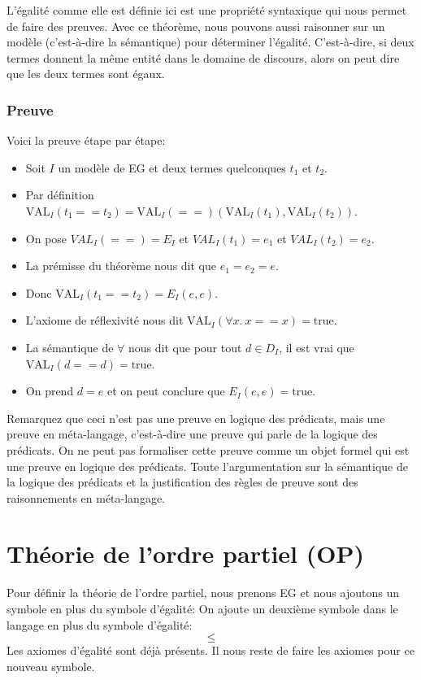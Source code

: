 {L'égalité comme elle est définie ici est une propriété syntaxique qui nous permet de faire des preuves.
Avec ce théorème, nous pouvons aussi raisonner sur un modèle (c'est-à-dire la sémantique) pour déterminer l'égalité.
C'est-à-dire, si deux termes donnent la même entité dans le domaine de discours, alors on peut dire que les
deux termes sont égaux.

\subsubsection{Preuve}

Voici la preuve étape par étape:
\begin{itemize}
\item Soit $I$ un modèle de EG et deux termes quelconques $t_{1}$ et $t_{2}$.
\item Par définition $\mathrm{VAL}_{I}(t_{1} == t_{2}) = \mathrm{VAL}_{I}(==)(\mathrm{VAL}_{I}(t_{1}), \mathrm{VAL}_{I}(t_{2}))$.
\item On pose $VAL_{I}(==) = E_{I}$ et $VAL_{I}(t_{1}) = e_1$ et $VAL_{I}(t_{2}) = e_2$.
\item La prémisse du théorème nous dit que $e_1 = e_2 = e$.
\item Donc $\mathrm{VAL}_{I}(t_{1} == t_{2}) =E_{I}(e,e)$.
\item L'axiome de réflexivité nous dit $\mathrm{VAL}_{I}(\forall x.\ x==x)= \mathrm{true}$.
\item La sémantique de $\forall$ nous dit que pour tout $d \in D_I$, il est vrai que $\mathrm{VAL}_{I}(d==d)=\mathrm{true}$.
\item On prend $d=e$ et on peut conclure que $E_{I}(e,e)=\mathrm{true}$.
\end{itemize}

\vspace{\baselineskip}
Remarquez que ceci n'est pas une preuve en logique des prédicats, mais une preuve en méta-langage, c'est-à-dire
une preuve qui parle de la logique des prédicats.
On ne peut pas formaliser cette preuve comme un objet formel qui est une preuve en logique des prédicats.
Toute l'argumentation sur la sémantique de la logique des prédicats et la justification des règles de preuve
sont des raisonnements en méta-langage.

\section{Théorie de l'ordre partiel (OP)}

Pour définir la théorie de l'ordre partiel, nous prenons EG et nous ajoutons un symbole en
plus du symbole d'égalité:
On ajoute un deuxième symbole dans le langage en plus du symbole d'égalité:
	$$\leq$$
Les axiomes d'égalité sont déjà présents.
Il nous reste de faire les axiomes pour ce nouveau symbole.

}
